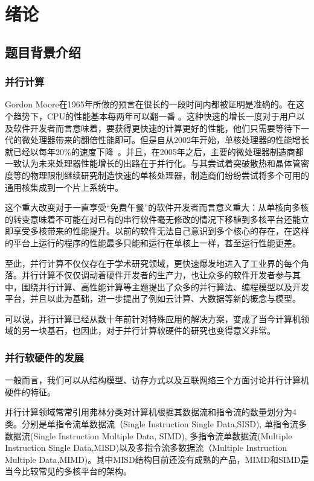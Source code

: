 \chapter{绪论}
\label{chap:Intro}
\section{题目背景介绍}
\subsection{并行计算}

Gordon Moore在1965年所做的预言在很长的一段时间内都被证明是准确的。在这个趋势下，CPU的性能基本每两年可以翻一番\cite{book:computer_architecture} 。这种快速的增长一度对于用户以及软件开发者而言意味着，要获得更快速的计算更好的性能，他们只需要等待下一代的微处理器带来的翻倍性能即可。但是自从2002年开始，单核处理器的性能增长就已经以每年20\%的速度下降~\cite{book:intro}。并且，在2005年之后，主要的微处理器制造商都一致认为未来处理器性能增长的出路在于并行化。与其尝试着突破散热和晶体管密度等的物理限制继续研究制造快速的单核处理器，制造商们纷纷尝试将多个可用的通用核集成到一个片上系统中。

这个重大改变对于一直享受“免费午餐”的软件开发者而言意义重大：从单核向多核的转变意味着不可能在对已有的串行软件毫无修改的情况下移植到多核平台还能立即享受多核带来的性能提升。以前的软件无法自己意识到多个核心的存在，在这样的平台上运行的程序的性能最多只能和运行在单核上一样，甚至运行性能更差。

至此，并行计算不仅仅存在于学术研究领域，更快速爆发地进入了工业界的每个角落。并行计算不仅仅调动着硬件开发者的生产力，也让众多的软件开发者参与其中，围绕并行计算、高性能计算等主题提出了众多的并行算法、编程模型以及开发平台，并且以此为基础，进一步提出了例如云计算、大数据等新的概念与模型。

可以说，并行计算已经从数十年前针对特殊应用的解决方案，变成了当今计算机领域的另一块基石，也因此，对于并行计算软硬件的研究也变得意义非常。

\subsection{并行软硬件的发展}\label{sec:progress}
一般而言，我们可以从结构模型、访存方式以及互联网络三个方面讨论并行计算机硬件的特征\cite{book:chen}。

并行计算领域常常引用弗林分类对计算机根据其数据流和指令流的数量划分为4类\cite{book:chen}。分别是单指令流单数据流（Single Instruction Single Data,SISD), 单指令流多数据流(Single Instruction Multiple Data, SIMD), 多指令流单数据流(Multiple Instruction Single Data,MISD)以及多指令流多数据流（Multiple Instruction Multiple Data,MIMD)。其中MISD结构目前还没有成熟的产品，MIMD和SIMD是当今比较常见的多核平台的架构。


